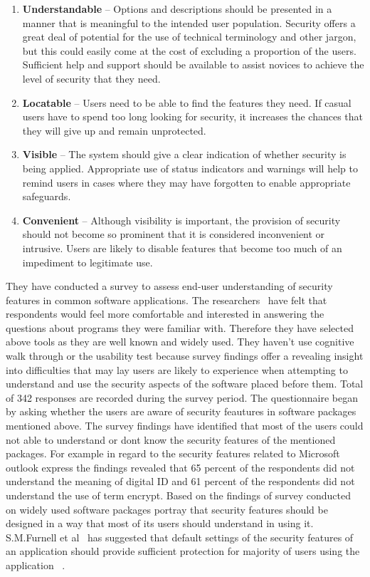  \begin{enumerate}
 	\item \textbf{Understandable} – Options and descriptions should be presented in a manner that is meaningful to the intended user population. Security offers a great deal of potential for the use of technical terminology and other jargon, but this could easily come at the cost of excluding a proportion of the users. Sufficient help and support should be available to assist novices to achieve the level of security that they need.
 	\item \textbf{Locatable} – Users need to be able to find the features they need. If casual users have to spend too long looking for security, it increases the chances that they will give up and remain unprotected.
 	\item \textbf{Visible} – The system should give a clear indication of whether security is being applied. Appropriate use of status indicators and warnings will help to remind users in cases where they may have forgotten to enable appropriate safeguards.
 	\item \textbf{Convenient} – Although visibility is important, the provision of security should not become so prominent that it is considered inconvenient or intrusive. Users are likely to disable features that become too much of an impediment to legitimate use.~\cite{furnell2006challenges}
 \end{enumerate}
 They have conducted a survey to assess end-user understanding of security features in common software applications. The researchers~\cite{furnell2006challenges} have felt that respondents would feel more comfortable and interested in answering the questions about programs they were familiar with. Therefore they have selected above tools as they are well known and widely used. They haven't use cognitive walk through or the usability test because survey findings offer a revealing insight into difficulties that may lay users are likely to experience when attempting to understand and use the security aspects of the software placed before them. Total of 342 responses are recorded during the survey period. The questionnaire began by asking whether the users are aware of security feautures in software packages mentioned above. The survey findings have identified that most of the users could not able to understand  or dont know the security features of the mentioned packages. For example in regard to the security features related to Microsoft outlook express the findings revealed that 65 percent of the respondents did not understand the meaning of digital ID and 61 percent of the respondents did not understand the use of term encrypt. Based on the findings of survey conducted on widely used software packages portray that security features should be designed in a way that most of its users should understand in using it. S.M.Furnell et al~\cite{furnell2006challenges} has suggested that default settings of the security features of an application should provide sufficient protection for majority of users using the application ~\cite{furnell2006challenges}. 
 
